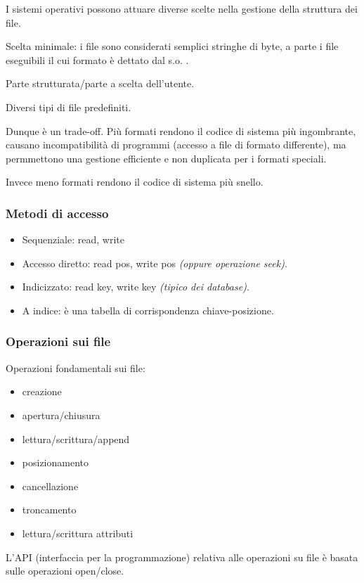 I sistemi operativi possono attuare diverse scelte nella
gestione della struttura dei file.

Scelta minimale: i file sono considerati semplici stringhe di byte, a parte i file eseguibili il cui formato è dettato dal s.o. .

Parte strutturata/parte a scelta dell'utente.

Diversi tipi di file predefiniti.

Dunque è un trade-off.
Più formati rendono il codice di sistema più ingombrante, causano incompatibilità di programmi (accesso a file di formato differente), ma permmettono una  gestione efficiente e non duplicata per i formati speciali.

Invece meno formati rendono il codice di sistema più snello.

\newpage
\subsubsection{Metodi di accesso}
\begin{itemize}
    \item Sequenziale: read, write
    \item Accesso diretto: read pos, write pos \textit{(oppure operazione seek)}.
    \item Indicizzato: read key, write key \textit{(tipico dei database)}.
    \item A indice: è una tabella di corrispondenza chiave-posizione. 
\end{itemize}

\subsubsection{Operazioni sui file}
Operazioni fondamentali sui file:
\begin{itemize}
    \item creazione
    \item apertura/chiusura
    \item lettura/scrittura/append
    \item posizionamento
    \item cancellazione
    \item troncamento
    \item lettura/scrittura attributi
\end{itemize}

L'API (interfaccia per la programmazione) relativa alle
operazioni su file è basata sulle operazioni open/close. 

